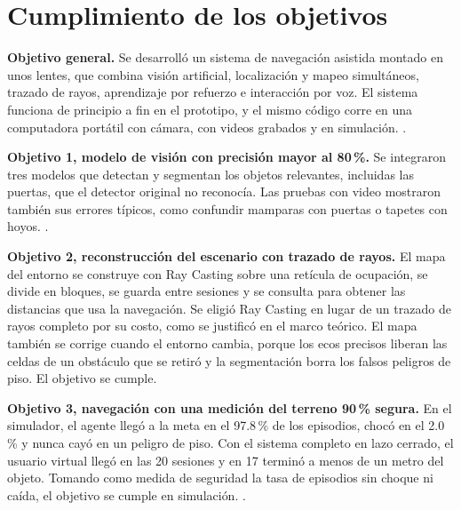\section{Cumplimiento de los objetivos}

\textbf{Objetivo general.} Se desarrolló un sistema de navegación asistida montado en
unos lentes, que combina visión artificial, localización y mapeo simultáneos, trazado de
rayos, aprendizaje por refuerzo e interacción por voz. El sistema funciona de principio a
fin en el prototipo, y el mismo código corre en una computadora portátil con cámara,
con videos grabados y en simulación. .

\textbf{Objetivo 1, modelo de visión con precisión mayor al 80\,\%.} Se integraron tres
modelos que detectan y segmentan los objetos relevantes, incluidas las puertas, que el
detector original no reconocía. Las pruebas con video mostraron también sus errores
típicos, como confundir mamparas con puertas o tapetes con hoyos. .

\textbf{Objetivo 2, reconstrucción del escenario con trazado de rayos.} El mapa del
entorno se construye con Ray Casting sobre una retícula de ocupación, se divide en
bloques, se guarda entre sesiones y se consulta para obtener las distancias que usa la
navegación. Se eligió Ray Casting en lugar de un trazado de rayos completo por su costo,
como se justificó en el marco teórico. El mapa también se corrige cuando el entorno
cambia, porque los ecos precisos liberan las celdas de un obstáculo que se retiró y la
segmentación borra los falsos peligros de piso. El objetivo se cumple.

\textbf{Objetivo 3, navegación con una medición del terreno 90\,\% segura.} En el
simulador, el agente llegó a la meta en el 97.8\,\% de los episodios, chocó en el
2.0\,\% y nunca cayó en un peligro de piso. Con el sistema completo en lazo cerrado,
el usuario virtual llegó en las 20 sesiones y en 17 terminó a menos de un metro del
objeto. Tomando como medida de seguridad la tasa de episodios sin choque ni caída, el
objetivo se cumple en simulación. .

